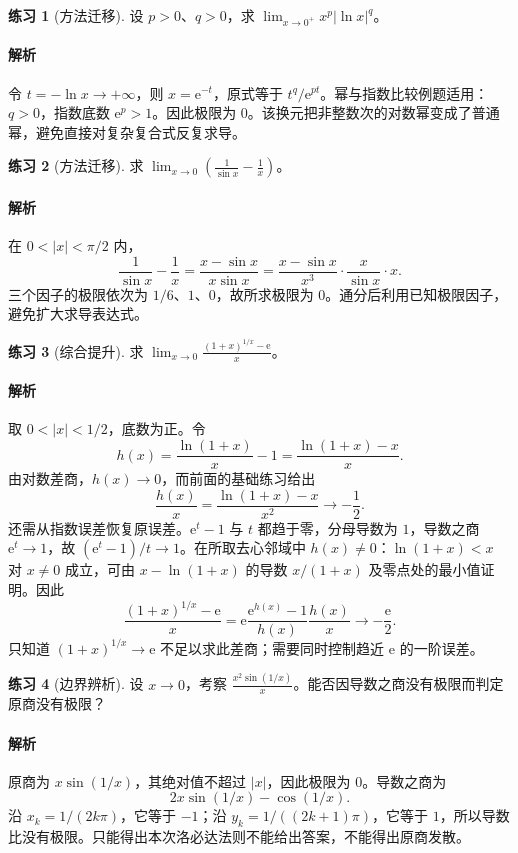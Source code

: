 \documentclass[UTF8,fontset=fandol,12pt,oneside,openany]{ctexrep}
\newcommand{\ee}{\mathrm e}
\theoremstyle{definition}
\newtheorem{exercise}{练习}[chapter]
\begin{document}
\begin{exercise}[方法迁移]
设 $p>0$、$q>0$，求 $\displaystyle\lim_{x\to0^+}x^p|\ln x|^q$。
\end{exercise}
\paragraph{解析}
令 $t=-\ln x\to+\infty$，则 $x=\ee^{-t}$，原式等于 $t^q/\ee^{pt}$。幂与指数比较例题适用：$q>0$，指数底数 $\ee^p>1$。因此极限为 $0$。该换元把非整数次的对数幂变成了普通幂，避免直接对复杂复合式反复求导。

\begin{exercise}[方法迁移]
求 $\displaystyle\lim_{x\to0}\left(\frac1{\sin x}-\frac1x\right)$。
\end{exercise}
\paragraph{解析}
在 $0<|x|<\pi/2$ 内，
\[
\frac1{\sin x}-\frac1x
=\frac{x-\sin x}{x\sin x}
=\frac{x-\sin x}{x^3}\cdot\frac{x}{\sin x}\cdot x.
\]
三个因子的极限依次为 $1/6$、$1$、$0$，故所求极限为 $0$。通分后利用已知极限因子，避免扩大求导表达式。

\begin{exercise}[综合提升]
求 $\displaystyle\lim_{x\to0}\frac{(1+x)^{1/x}-\ee}{x}$。
\end{exercise}
\paragraph{解析}
取 $0<|x|<1/2$，底数为正。令
\[
h(x)=\frac{\ln(1+x)}x-1
=\frac{\ln(1+x)-x}{x}.
\]
由对数差商，$h(x)\to0$，而前面的基础练习给出
\[
\frac{h(x)}x=\frac{\ln(1+x)-x}{x^2}\to-\frac12.
\]
还需从指数误差恢复原误差。$\ee^t-1$ 与 $t$ 都趋于零，分母导数为 $1$，导数之商 $\ee^t\to1$，故 $(\ee^t-1)/t\to1$。在所取去心邻域中 $h(x)\ne0$：$\ln(1+x)<x$ 对 $x\ne0$ 成立，可由 $x-\ln(1+x)$ 的导数 $x/(1+x)$ 及零点处的最小值证明。因此
\[
\frac{(1+x)^{1/x}-\ee}{x}
=\ee\frac{\ee^{h(x)}-1}{h(x)}\frac{h(x)}x
\longrightarrow-\frac{\ee}{2}.
\]
只知道 $(1+x)^{1/x}\to\ee$ 不足以求此差商；需要同时控制趋近 $\ee$ 的一阶误差。

\begin{exercise}[边界辨析]
设 $x\to0$，考察 $\displaystyle\frac{x^2\sin(1/x)}x$。能否因导数之商没有极限而判定原商没有极限？
\end{exercise}
\paragraph{解析}
原商为 $x\sin(1/x)$，其绝对值不超过 $|x|$，因此极限为 $0$。导数之商为
\[
2x\sin(1/x)-\cos(1/x).
\]
沿 $x_k=1/(2k\pi)$，它等于 $-1$；沿 $y_k=1/((2k+1)\pi)$，它等于 $1$，所以导数比没有极限。只能得出本次洛必达法则不能给出答案，不能得出原商发散。
\end{document}
